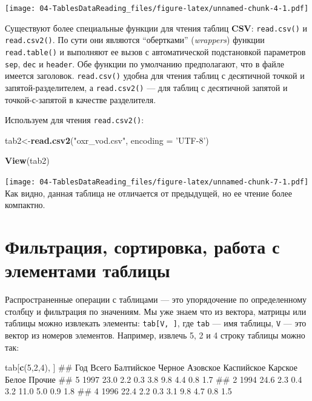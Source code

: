 \documentclass[]{book}
\newenvironment{Shaded}{\begin{snugshade}}{\end{snugshade}}
\newcommand{\KeywordTok}[1]{\textcolor[rgb]{0.13,0.29,0.53}{\textbf{#1}}}
\newcommand{\DataTypeTok}[1]{\textcolor[rgb]{0.13,0.29,0.53}{#1}}
\newcommand{\DecValTok}[1]{\textcolor[rgb]{0.00,0.00,0.81}{#1}}
\newcommand{\StringTok}[1]{\textcolor[rgb]{0.31,0.60,0.02}{#1}}
\newcommand{\NormalTok}[1]{#1}
\begin{document}
\texttt{[image: 04-TablesDataReading\_files/figure-latex/unnamed-chunk-4-1.pdf]}

Существуют более специальные функции для чтения таблиц \textbf{CSV}:
\texttt{read.csv()} и \texttt{read.csv2()}. По сути они являются
``обертками'' (\emph{wrappers}) функции \texttt{read.table()} и
выполняют ее вызов с автоматической подстановкой параметров
\texttt{sep}, \texttt{dec} и \texttt{header}. Обе функции по умолчанию
предполагают, что в файле имеется заголовок. \texttt{read.csv()} удобна
для чтения таблиц с десятичной точкой и запятой-разделителем, а
\texttt{read.csv2()} --- для таблиц с десятичной запятой и
точкой-с-запятой в качестве разделителя.

Используем для чтения \texttt{read.csv2()}:

\begin{Shaded}
\begin{Highlighting}[]
\NormalTok{tab2<-}\KeywordTok{read.csv2}\NormalTok{(}\StringTok{"oxr_vod.csv"}\NormalTok{, }\DataTypeTok{encoding =} \StringTok{'UTF-8'}\NormalTok{)}
\end{Highlighting}
\end{Shaded}

\begin{Shaded}
\begin{Highlighting}[]
\KeywordTok{View}\NormalTok{(tab2)}
\end{Highlighting}
\end{Shaded}

\texttt{[image: 04-TablesDataReading\_files/figure-latex/unnamed-chunk-7-1.pdf]}
Как видно, данная таблица не отличается от предыдущей, но ее чтение
более компактно.

\section{Фильтрация, сортировка, работа с элементами
таблицы}\label{filtering_sorting}

Распространенные операции с таблицами --- это упорядочение по
определенному столбцу и фильтрация по значениям. Мы уже знаем что из
вектора, матрицы или таблицы можно извлекать элементы:
\texttt{tab{[}V,\ {]}}, где \texttt{tab} --- имя таблицы, \texttt{V} ---
это вектор из номеров элементов. Например, извлечь 5, 2 и 4 строку
таблицы можно так:

\begin{Shaded}
\begin{Highlighting}[]
\NormalTok{tab[}\KeywordTok{c}\NormalTok{(}\DecValTok{5}\NormalTok{,}\DecValTok{2}\NormalTok{,}\DecValTok{4}\NormalTok{), ]}
\NormalTok{##    Год Всего Балтийское Черное Азовское Каспийское Карское Белое Прочие}
\NormalTok{## 5 1997  23.0        2.2    0.3      3.8        9.8     4.4   0.8    1.7}
\NormalTok{## 2 1994  24.6        2.3    0.4      3.2       11.0     5.0   0.9    1.8}
\NormalTok{## 4 1996  22.4        2.2    0.3      3.1        9.8     4.7   0.8    1.5}
\end{Highlighting}
\end{Shaded}
\end{document}
